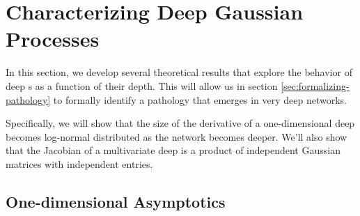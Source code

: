 



\section{Characterizing Deep Gaussian Processes}
\label{sec:characterizing-deep-gps}

In this section, we develop several theoretical results that explore the behavior of deep \gp{}s as a function of their depth.  This will allow us in section \ref{sec:formalizing-pathology} to formally identify a pathology that emerges in very deep networks.

Specifically, we will show that the size of the derivative of a one-dimensional deep \gp{} becomes log-normal distributed as the network becomes deeper.  We'll also show that the Jacobian of a multivariate deep \gp{} is a product of independent Gaussian matrices with independent entries.


\subsection{One-dimensional Asymptotics}
\label{sec:1d}


